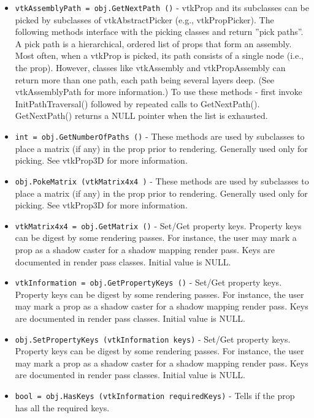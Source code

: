 \begin{itemize}
\item  \verb|vtkAssemblyPath = obj.GetNextPath ()| -  vtkProp and its subclasses can be picked by subclasses of
 vtkAbstractPicker (e.g., vtkPropPicker). The following methods interface
 with the picking classes and return ''pick paths''. A pick path is a
 hierarchical, ordered list of props that form an assembly.  Most often,
 when a vtkProp is picked, its path consists of a single node (i.e., the
 prop). However, classes like vtkAssembly and vtkPropAssembly can return
 more than one path, each path being several layers deep. (See
 vtkAssemblyPath for more information.)  To use these methods - first
 invoke InitPathTraversal() followed by repeated calls to GetNextPath().
 GetNextPath() returns a NULL pointer when the list is exhausted.

\item  \verb|int = obj.GetNumberOfPaths ()| -  These methods are used by subclasses to place a matrix (if any) in the
 prop prior to rendering. Generally used only for picking. See vtkProp3D
 for more information.

\item  \verb|obj.PokeMatrix (vtkMatrix4x4 )| -  These methods are used by subclasses to place a matrix (if any) in the
 prop prior to rendering. Generally used only for picking. See vtkProp3D
 for more information.

\item  \verb|vtkMatrix4x4 = obj.GetMatrix ()| -  Set/Get property keys. Property keys can be digest by some rendering
 passes.
 For instance, the user may mark a prop as a shadow caster for a
 shadow mapping render pass. Keys are documented in render pass classes.
 Initial value is NULL.

\item  \verb|vtkInformation = obj.GetPropertyKeys ()| -  Set/Get property keys. Property keys can be digest by some rendering
 passes.
 For instance, the user may mark a prop as a shadow caster for a
 shadow mapping render pass. Keys are documented in render pass classes.
 Initial value is NULL.

\item  \verb|obj.SetPropertyKeys (vtkInformation keys)| -  Set/Get property keys. Property keys can be digest by some rendering
 passes.
 For instance, the user may mark a prop as a shadow caster for a
 shadow mapping render pass. Keys are documented in render pass classes.
 Initial value is NULL.

\item  \verb|bool = obj.HasKeys (vtkInformation requiredKeys)| -  Tells if the prop has all the required keys.
 

\end{itemize}
